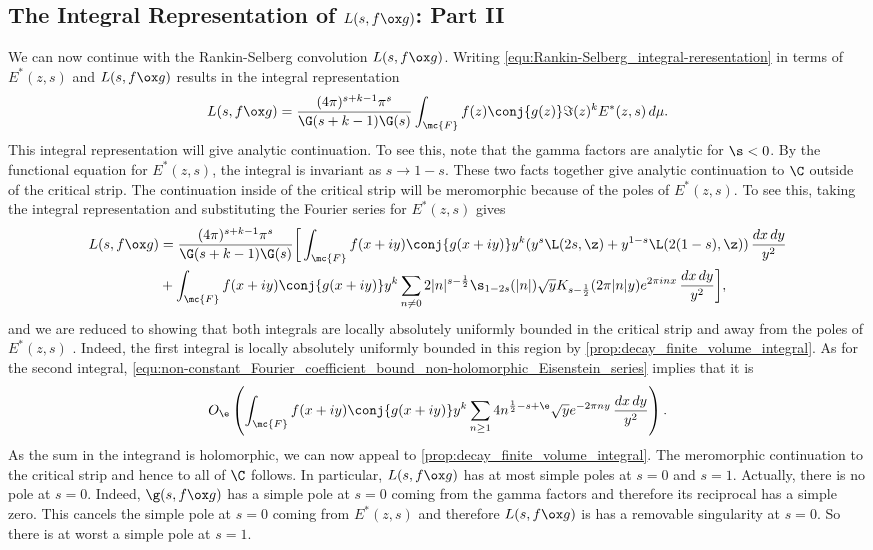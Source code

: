     \subsection*{The Integral Representation of \texorpdfstring{$L(s,f \ox g)$}{L(s,f \ox g)}: Part II}
      We can now continue with the Rankin-Selberg convolution $L(s,f \ox g)$. Writing \cref{equ:Rankin-Selberg_integral-reresentation} in terms of $E^{\ast}(z,s)$ and $L(s,f \ox g)$ results in the integral representation
      \[
        L(s,f \ox g) = \frac{(4\pi)^{s+k-1}\pi^{s}}{\G(s+k-1)\G(s)}\int_{\mc{F}}f(z)\conj{g(z)}\Im(z)^{k}E^{\ast}(z,s)\,d\mu.
      \]
      This integral representation will give analytic continuation. To see this, note that the gamma factors are analytic for $\s < 0$. By the functional equation for $E^{\ast}(z,s)$, the integral is invariant as $s \to 1-s$. These two facts together give analytic continuation to $\C$ outside of the critical strip. The continuation inside of the critical strip will be meromorphic because of the poles of $E^{\ast}(z,s)$. To see this, taking the integral representation and substituting the Fourier series for $E^{\ast}(z,s)$ gives
      \begin{equation}\label{equ:integral_representation_Rankin_Selberg}
        \begin{aligned}
          L(s,f \ox g) &= \frac{(4\pi)^{s+k-1}\pi^{s}}{\G(s+k-1)\G(s)}\bigg[\int_{\mc{F}}f(x+iy)\conj{g(x+iy)}y^{k}(y^{s}\L(2s,\z)+y^{1-s}\L(2(1-s),\z))\,\frac{dx\,dy}{y^{2}} \\
          &+\int_{\mc{F}}f(x+iy)\conj{g(x+iy)}y^{k}\sum_{n \neq 0}2|n|^{s-\frac{1}{2}}\s_{1-2s}(|n|)\sqrt{y}K_{s-\frac{1}{2}}(2\pi|n|y)e^{2\pi inx}\,\frac{dx\,dy}{y^{2}}\bigg],
        \end{aligned}
      \end{equation}
      and we are reduced to showing that both integrals are locally absolutely uniformly bounded in the critical strip and away from the poles of $E^{\ast}(z,s)$ . Indeed, the first integral is locally absolutely uniformly bounded in this region by \cref{prop:decay_finite_volume_integral}. As for the second integral, \cref{equ:non-constant_Fourier_coefficient_bound_non-holomorphic_Eisenstein_series} implies that it is
      \[
        O_{\e}\left(\int_{\mc{F}}f(x+iy)\conj{g(x+iy)}y^{k}\sum_{n \ge 1}4n^{\frac{1}{2}-s+\e}\sqrt{y}e^{-2\pi ny}\,\frac{dx\,dy}{y^{2}}\right).
      \]
      As the sum in the integrand is holomorphic, we can now appeal to \cref{prop:decay_finite_volume_integral}. The meromorphic continuation to the critical strip and hence to all of $\C$ follows. In particular, $L(s,f \ox g)$ has at most simple poles at $s = 0$ and $s = 1$. Actually, there is no pole at $s = 0$. Indeed, $\g(s,f \ox g)$ has a simple pole at $s = 0$ coming from the gamma factors and therefore its reciprocal has a simple zero. This cancels the simple pole at $s = 0$ coming from $E^{\ast}(z,s)$ and therefore $L(s,f \ox g)$ is has a removable singularity at $s = 0$. So there is at worst a simple pole at $s = 1$.
